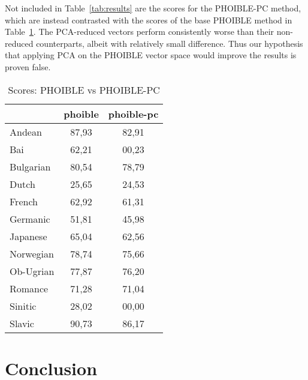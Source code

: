 \documentclass[a4paper]{report}
\begin{document}
Not included in Table~\ref{tab:results} are the scores for the PHOIBLE-PC method,
which are instead contrasted with the scores of the base PHOIBLE method in Table~\ref{tab:phoible}.
The PCA-reduced vectors perform consistently worse than their non-reduced counterparts, albeit with relatively small difference.
Thus our hypothesis that applying PCA on the PHOIBLE vector space would improve the results is proven false.

\begin{table}[h]
	\centering\small
	\begin{tabular}{l *{2}{c}}
		\toprule
		& phoible & phoible-pc \\
		\midrule
		Andean		&	87,93 &	82,91 \\
		Bai			&	62,21 &	00,23 \\
		Bulgarian	&	80,54 &	78,79 \\
		Dutch		&	25,65 &	24,53 \\
		French		&	62,92 &	61,31 \\
		Germanic	&	51,81 &	45,98 \\
		Japanese	&	65,04 &	62,56 \\
		Norwegian	&	78,74 &	75,66 \\
		Ob-Ugrian	&	77,87 &	76,20 \\
		Romance		&	71,28 &	71,04 \\
		Sinitic		&	28,02 &	00,00 \\
		Slavic		&	90,73 &	86,17 \\
		\bottomrule
	\end{tabular}
	\caption{Scores: PHOIBLE vs PHOIBLE-PC}
	\label{tab:phoible}
\end{table}


\chapter{Conclusion}



\end{document}
